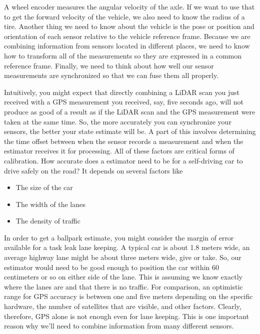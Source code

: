 A wheel encoder measures the angular velocity of the axle. If we want to use that to get the forward velocity of the vehicle, we also need to know the radius of a tire. Another thing we need to know about the vehicle is the pose or position and orientation of each sensor relative to the vehicle reference frame. Because we are combining information from sensors located in different places, we need to know how to transform all of the measurements so they are expressed in a common reference frame. Finally, we need to think about how well our sensor measurements are synchronized so that we can fuse them all properly. 

Intuitively, you might expect that directly combining a LiDAR scan you just received with a GPS measurement you received, say, five seconds ago, will not produce as good of a result as if the LiDAR scan and the GPS measurement were taken at the same time. So, the more accurately you can synchronize your sensors, the better your state estimate will be. A part of this involves determining the time offset between when the sensor records a measurement and when the estimator receives it for processing. All of these factors are critical forms of calibration.  How accurate does a estimator need to be for a self-driving car to drive safely on the road? It depends on several factors like

\begin{itemize}
\item The size of the car
\item The width of the lanes
\item The density of traffic
\end{itemize}

 In order to get a ballpark estimate, you might consider the margin of error available for a task leak lane keeping. A typical car is about 1.8 meters wide, an average highway 
lane might be about three meters wide, give or take. So, our estimator would need to be good enough to position the car within 60 centimeters or so on either side of the lane. 
This is assuming we know exactly where the lanes are and that there is no traffic. For comparison, an optimistic range for GPS accuracy is between one and five meters depending on the specific hardware, the number of satellites that are visible, and other factors. Clearly, therefore, GPS alone is not enough even for lane keeping. This is one important reason why we'll need to combine information from many different sensors. 


